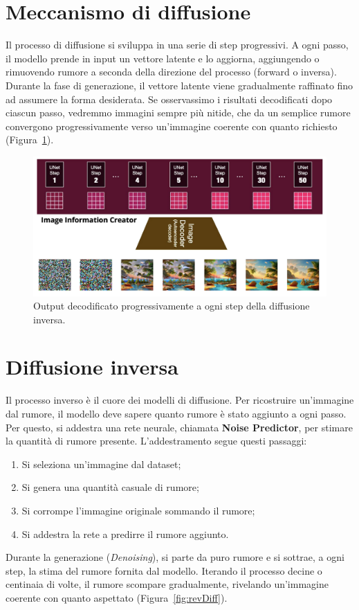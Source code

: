 \section{Meccanismo di diffusione}
Il processo di diffusione si sviluppa in una serie di step progressivi. A ogni passo, il modello prende in input un vettore latente e lo aggiorna, aggiungendo o rimuovendo rumore a seconda della direzione del processo (forward o inversa). Durante la fase di generazione, il vettore latente viene gradualmente raffinato fino ad assumere la forma desiderata. Se osservassimo i risultati decodificati dopo ciascun passo, vedremmo immagini sempre più nitide, che da un semplice rumore convergono progressivamente verso un’immagine coerente con quanto richiesto (Figura~\ref{fig:stepDiff}).

\begin{figure}
    \centering
    \includegraphics[width=\textwidth]{figure/DiffusionStep.png}
    \caption{Output decodificato progressivamente a ogni step della diffusione inversa.}
    \label{fig:stepDiff}
\end{figure}

\section{Diffusione inversa}

Il processo inverso è il cuore dei modelli di diffusione. Per ricostruire un’immagine dal rumore, il modello deve sapere quanto rumore è stato aggiunto a ogni passo. Per questo, si addestra una rete neurale, chiamata \textbf{Noise Predictor}, per stimare la quantità di rumore presente. L’addestramento segue questi passaggi:

\begin{enumerate}
    \item Si seleziona un'immagine dal dataset;
    \item Si genera una quantità casuale di rumore;
    \item Si corrompe l'immagine originale sommando il rumore;
    \item Si addestra la rete a predirre il rumore aggiunto.
\end{enumerate}
Durante la generazione (\textit{Denoising}), si parte da puro rumore e si sottrae, a ogni step, la stima del rumore fornita dal modello. Iterando il processo decine o centinaia di volte, il rumore scompare gradualmente, rivelando un’immagine coerente con quanto aspettato (Figura~\ref{fig:revDiff}).

